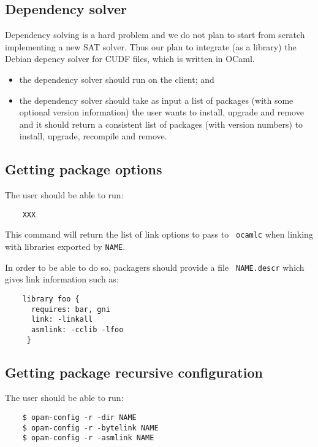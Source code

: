 \documentclass[a4paper,11pt]{article}
\begin{document}
\subsection{Dependency solver}
\label{deps}

Dependency solving is a hard problem and we do not plan to start from
scratch implementing a new SAT solver. Thus our plan to integrate (as
a library) the Debian depency solver for CUDF files, which is written
in OCaml.

\begin{itemize}
\item the dependency solver should run on the client; and
\item the dependency solver should take as input a list of packages
  (with some optional version information) the user wants to install,
  upgrade and remove and it should return a consistent list of
  packages (with version numbers) to install, upgrade, recompile and
  remove.
\end{itemize}

\subsection{Getting package options}

The user should be able to run:

\begin{verbatim}
    XXX
\end{verbatim}

This command will return the list of link options to pass to {\tt
  ocamlc} when linking with libraries exported by {\tt NAME}.

In order to be able to do so, packagers should provide a file {\tt
  NAME.descr} which gives link information such as:

\begin{verbatim}
    library foo {
      requires: bar, gni
      link: -linkall
      asmlink: -cclib -lfoo
     }
\end{verbatim}

\subsection{Getting package recursive configuration}

The user should be able to run:

\begin{verbatim}
    $ opam-config -r -dir NAME
    $ opam-config -r -bytelink NAME
    $ opam-config -r -asmlink NAME
\end{verbatim}
\end{document}
